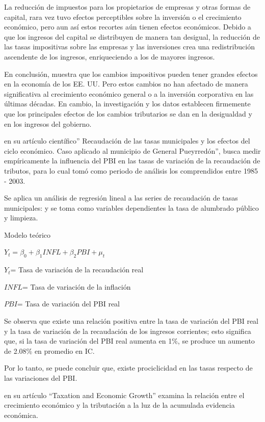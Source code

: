 \documentclass[
  letterpaper,
  DIV=11,
  numbers=noendperiod]{scrartcl}
\begin{document}
La reducción de impuestos para los propietarios de empresas y otras
formas de capital, rara vez tuvo efectos perceptibles sobre la inversión
o el crecimiento económico, pero aun así estos recortes aún tienen
efectos económicos. Debido a que los ingresos del capital se distribuyen
de manera tan desigual, la reducción de las tasas impositivas sobre las
empresas y las inversiones crea una redistribución ascendente de los
ingresos, enriqueciendo a los de mayores ingresos.

En conclusión, muestra que los cambios impositivos pueden tener grandes
efectos en la economía de los EE. UU. Pero estos cambios no han afectado
de manera significativa al crecimiento económico general o a la
inversión corporativa en las últimas décadas. En cambio, la
investigación y los datos establecen firmemente que los principales
efectos de los cambios tributarios se dan en la desigualdad y en los
ingresos del gobierno.

\textcite{mingo_recaudacion_2003} en su artículo científico''
Recaudación de las tasas municipales y los efectos del ciclo económico.
Caso aplicado al municipio de General Pueyrredón'', busca medir
empíricamente la influencia del PBI en las tasas de variación de la
recaudación de tributos, para lo cual tomó como periodo de análisis los
comprendidos entre 1985 - 2003.

Se aplica un análisis de regresión lineal a las series de recaudación de
tasas municipales: y se toma como variables dependientes la tasa de
alumbrado público y limpieza.

Modelo teórico

\(Y_t= \beta_{0} + \beta_{1}INFL + \beta_{2}PBI + \mu_{t}\)

\(Y_t\)= Tasa de variación de la recaudación real

\(INFL\)= Tasa de variación de la inflación

\(PBI\)= Tasa de variación del PBI real

Se observa que existe una relación positiva entre la tasa de variación
del PBI real y la tasa de variación de la recaudación de los ingresos
corrientes; esto significa que, si la tasa de variación del PBI real
aumenta en 1\%, se produce un aumento de 2.08\% en promedio en IC.

Por lo tanto, se puede concluir que, existe prociclicidad en las tasas
respecto de las variaciones del PBI.

\textcite{engen_taxation_1996} en su artículo ``Taxation and Economic
Growth'' examina la relación entre el crecimiento económico y la
tributación a la luz de la acumulada evidencia económica.
\end{document}

